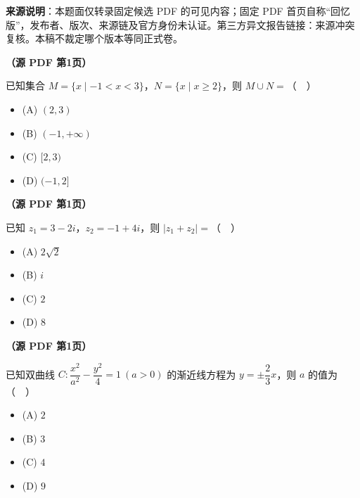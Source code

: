 

\begin{gktip}
\textbf{来源说明}：本题面仅转录固定候选 PDF 的可见内容；固定 PDF 首页自称“回忆版”，发布者、版次、来源链及官方身份未认证。第三方异文报告链接：来源冲突复核。本稿不裁定哪个版本等同正式卷。
\end{gktip}


\begin{question}
\textbf{（源 PDF 第1页）} 

已知集合 \(M=\{x\mid -1<x<3\}\)，\(N=\{x\mid x\geq 2\}\)，则 \(M\cup N=\)（　）

\begin{itemize}
\item (A) \((2,3)\)
\item (B) \((-1,+\infty)\)
\item (C) \([2,3)\)
\item (D) \((-1,2]\)
\end{itemize}

\end{question}
\begin{question}
\textbf{（源 PDF 第1页）} 

已知 \(z_1=3-2i\)，\(z_2=-1+4i\)，则 \(\lvert z_1+z_2\rvert=\)（　）

\begin{itemize}
\item (A) \(2\sqrt{2}\)
\item (B) \(i\)
\item (C) \(2\)
\item (D) \(8\)
\end{itemize}

\end{question}
\begin{question}
\textbf{（源 PDF 第1页）} 

已知双曲线 \(C:\dfrac{x^2}{a^2}-\dfrac{y^2}{4}=1\ (a>0)\) 的渐近线方程为 \(y=\pm\dfrac{2}{3}x\)，则 \(a\) 的值为（　）

\begin{itemize}
\item (A) \(2\)
\item (B) \(3\)
\item (C) \(4\)
\item (D) \(9\)
\end{itemize}

\end{question}
